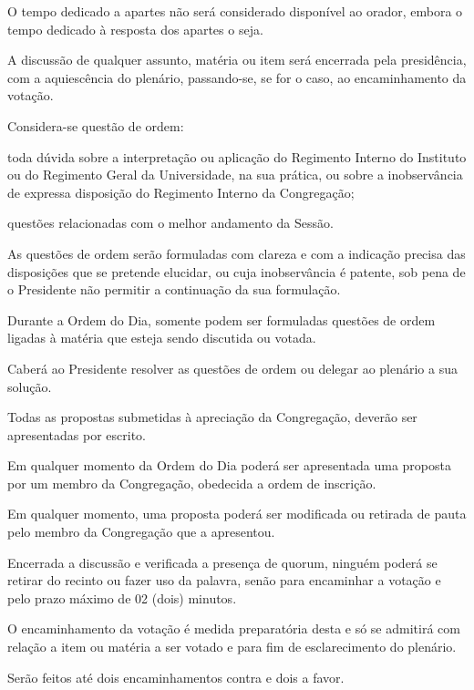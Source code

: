 \documentclass{documento}
\begin{document}
\paragrafo O tempo dedicado a apartes não será considerado disponível ao orador, embora o tempo dedicado à resposta dos apartes o seja.

\artigo A discussão de qualquer assunto, matéria ou item será encerrada pela presidência, com a aquiescência do plenário, passando-se, se for o caso, ao encaminhamento da votação.


\artigo Considera-se questão de ordem:

\inciso toda dúvida sobre a interpretação ou aplicação do Regimento Interno do Instituto ou do Regimento Geral da Universidade, na sua prática, ou sobre a inobservância de expressa disposição do Regimento Interno da Congregação;

\inciso questões relacionadas com o melhor andamento da Sessão.

\paragrafo As questões de ordem serão formuladas com clareza e com a indicação precisa das disposições que se pretende elucidar, ou cuja inobservância é patente, sob pena de o Presidente não permitir a continuação da sua formulação.

\paragrafo Durante a Ordem do Dia, somente podem ser formuladas questões de ordem ligadas à matéria que esteja sendo discutida ou votada.

\paragrafo Caberá ao Presidente resolver as questões de ordem ou delegar ao plenário a sua solução.


\artigo Todas as propostas submetidas à apreciação da Congregação, deverão ser apresentadas por escrito.

\paragrafo Em qualquer momento da Ordem do Dia poderá ser apresentada uma proposta por um membro da Congregação, obedecida a ordem de inscrição.

\paragrafo Em qualquer momento, uma proposta poderá ser modificada ou retirada de pauta pelo membro da Congregação que a apresentou.

\artigo Encerrada a discussão e verificada a presença de quorum, ninguém poderá se retirar do recinto ou fazer uso da palavra, senão para encaminhar a votação e pelo prazo máximo de 02 (dois) minutos.

\paragrafo O encaminhamento da votação é medida preparatória desta e só se admitirá com relação a item ou matéria a ser votado e para fim de esclarecimento do plenário.

\paragrafo Serão feitos até dois encaminhamentos contra e dois a favor.
\end{document}
